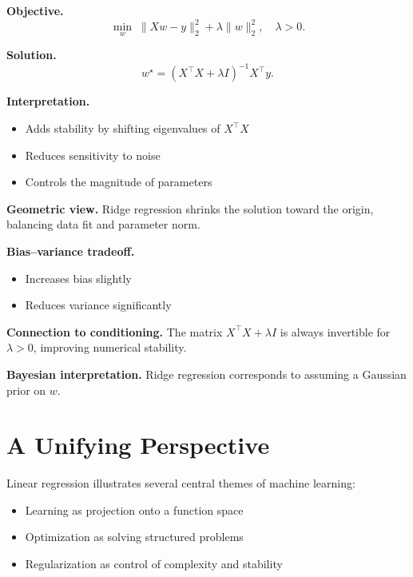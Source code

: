 \medskip

\noindent
\textbf{Objective.}
\[
\min_{w} \; \|Xw - y\|_2^2 + \lambda \|w\|_2^2,
\quad \lambda > 0.
\]

\medskip

\noindent
\textbf{Solution.}
\[
w^\star = (X^\top X + \lambda I)^{-1} X^\top y.
\]

\medskip

\noindent
\textbf{Interpretation.}
\begin{itemize}
    \item Adds stability by shifting eigenvalues of $X^\top X$
    \item Reduces sensitivity to noise
    \item Controls the magnitude of parameters
\end{itemize}

\medskip

\noindent
\textbf{Geometric view.}  
Ridge regression shrinks the solution toward the origin, balancing data fit and parameter norm.

\medskip

\noindent
\textbf{Bias--variance tradeoff.}
\begin{itemize}
    \item Increases bias slightly
    \item Reduces variance significantly
\end{itemize}

\medskip

\noindent
\textbf{Connection to conditioning.}  
The matrix $X^\top X + \lambda I$ is always invertible for $\lambda > 0$, improving numerical stability.

\medskip

\noindent
\textbf{Bayesian interpretation.}  
Ridge regression corresponds to assuming a Gaussian prior on $w$.

\section{A Unifying Perspective}

Linear regression illustrates several central themes of machine learning:

\begin{itemize}
    \item Learning as projection onto a function space
    \item Optimization as solving structured problems
    \item Regularization as control of complexity and stability
\end{itemize}


